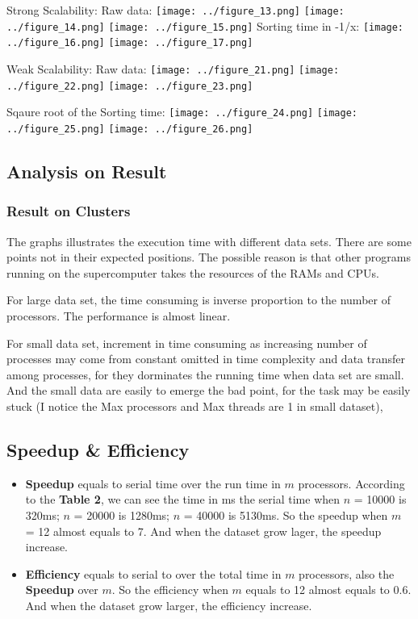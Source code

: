 \documentclass{article}
\begin{document}
\begin{center}
	\clearpage
	Strong Scalability:
	Raw data:
	\texttt{[image: ../figure\_13.png]}
	\texttt{[image: ../figure\_14.png]}
	\texttt{[image: ../figure\_15.png]}
	\clearpage
	Sorting time in -1/x:
	\texttt{[image: ../figure\_16.png]}
	\texttt{[image: ../figure\_17.png]}

	\clearpage
	Weak Scalability:
	Raw data:
	\texttt{[image: ../figure\_21.png]}
	\texttt{[image: ../figure\_22.png]}
	\texttt{[image: ../figure\_23.png]}

	Sqaure root of the Sorting time:
	\texttt{[image: ../figure\_24.png]}
	\texttt{[image: ../figure\_25.png]}
	\texttt{[image: ../figure\_26.png]}

\end{center}


	\clearpage
	\subsection{Analysis on Result}
		\subsubsection{Result on Clusters}
			The graphs illustrates the execution time with different data
			sets. There are some points not in their expected positions.
			The possible reason is that other programs running on the
			supercomputer takes the resources of the RAMs and CPUs.

			For large data set, the time consuming is inverse proportion
			to the number of processors. The performance is almost
			linear.

			For small data set, increment in time consuming as increasing
			number of processes may come from constant omitted in time
			complexity and data transfer among processes,
			for they dorminates the running time when data set are
			small. And the small data are easily to emerge the bad
			point, for the task may be easily stuck (I notice the
			Max processors and Max threads are 1 in small dataset),

	\subsection {Speedup & Efficiency}
	\begin{itemize}
		\item
			{\bf Speedup} equals to serial time over the
			run time in $m$ processors. According to the
			{\bf Table 2}, we can see the time in ms
			the serial time when $n$ = 10000 is 320ms;
			$n$ = 20000 is 1280ms; $n$ = 40000 is 5130ms.
			So the speedup when $m$ = 12 almost equals to
			7. And when the dataset grow lager, the speedup
			increase.
		\item
			{\bf Efficiency} equals to serial to over the
			total time in $m$ processors, also the {\bf Speedup}
			over $m$. So the efficiency when $m$ equals to 12
			almost equals to 0.6. And when the dataset grow
			larger, the efficiency increase.
	\end{itemize}
\end{document}
